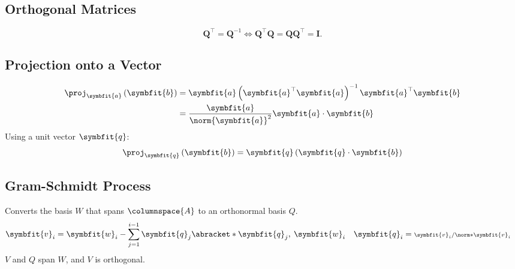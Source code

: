 \documentclass{article}
\begin{document}
\begin{multicols*}{3}
    \subsection{Orthogonal Matrices}
    \begin{equation*}
        \symbf{Q}^\top = \symbf{Q}^{-1}
        \iff
        \symbf{Q}^\top \symbf{Q} = \symbf{Q}\symbf{Q}^\top = \symbf{I}.
    \end{equation*}
    \subsection{Projection onto a Vector}
    \begin{align*}
        \proj_{\symbfit{a}} \left( \symbfit{b} \right) & = \symbfit{a} \left( \symbfit{a}^\top \symbfit{a} \right)^{-1} \symbfit{a}^\top \symbfit{b} \\
                                                       & = \frac{\symbfit{a}}{\norm{\symbfit{a}}^2} \symbfit{a} \cdot \symbfit{b}
    \end{align*}
    Using a unit vector \(\symbfit{q}\):
    \begin{equation*}
        \proj_{\symbfit{q}} \left( \symbfit{b} \right) = \symbfit{q} \left( \symbfit{q} \cdot \symbfit{b} \right)
    \end{equation*}
    \subsection{Gram-Schmidt Process}
    Converts the basis \(W\) that spans \(\columnspace{A}\) to an orthonormal basis \(Q\).
    \begin{align*}
        \symbfit{v}_i & = \symbfit{w}_i - \sum_{j = 1}^{i - 1} \symbfit{q}_j \abracket*{\symbfit{q}_j,\: \symbfit{w}_i} & \symbfit{q}_i & = {\scriptstyle \symbfit{v}_i / \norm*{\symbfit{v}_i}}
    \end{align*}
    \(V\) and \(Q\) span \(W\), and \(V\) is orthogonal.

\end{multicols*}
\end{document}
